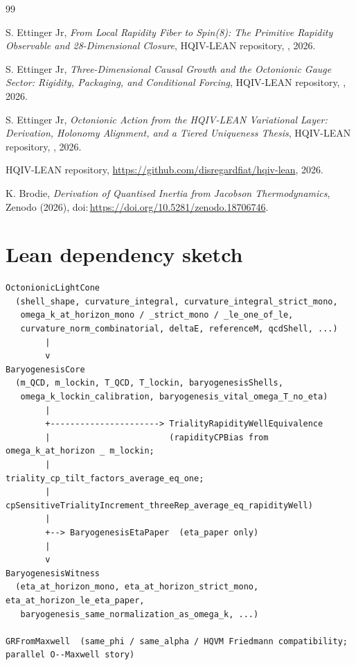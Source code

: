 \documentclass[11pt]{amsart}
\begin{document}
\begin{thebibliography}{99}

S. Ettinger Jr, \emph{From Local Rapidity Fiber to Spin(8): The Primitive Rapidity Observable and 28-Dimensional Closure}, HQIV-LEAN repository, , 2026.

S. Ettinger Jr, \emph{Three-Dimensional Causal Growth and the Octonionic Gauge Sector: Rigidity, Packaging, and Conditional Forcing}, HQIV-LEAN repository, , 2026.

S. Ettinger Jr, \emph{Octonionic Action from the HQIV-LEAN Variational Layer: Derivation, Holonomy Alignment, and a Tiered Uniqueness Thesis}, HQIV-LEAN repository, , 2026.

HQIV-LEAN repository, \url{https://github.com/disregardfiat/hqiv-lean}, 2026.

K. Brodie, \emph{Derivation of Quantised Inertia from Jacobson Thermodynamics}, Zenodo (2026), doi:\,\url{https://doi.org/10.5281/zenodo.18706746}.

\end{thebibliography}

\appendix
\section{Lean dependency sketch}

\begin{verbatim}
OctonionicLightCone
  (shell_shape, curvature_integral, curvature_integral_strict_mono,
   omega_k_at_horizon_mono / _strict_mono / _le_one_of_le,
   curvature_norm_combinatorial, deltaE, referenceM, qcdShell, ...)
        |
        v
BaryogenesisCore
  (m_QCD, m_lockin, T_QCD, T_lockin, baryogenesisShells,
   omega_k_lockin_calibration, baryogenesis_vital_omega_T_no_eta)
        |
        +----------------------> TrialityRapidityWellEquivalence
        |                        (rapidityCPBias from omega_k_at_horizon _ m_lockin;
        |                         triality_cp_tilt_factors_average_eq_one;
        |                         cpSensitiveTrialityIncrement_threeRep_average_eq_rapidityWell)
        |
        +--> BaryogenesisEtaPaper  (eta_paper only)
        |
        v
BaryogenesisWitness
  (eta_at_horizon_mono, eta_at_horizon_strict_mono, eta_at_horizon_le_eta_paper,
   baryogenesis_same_normalization_as_omega_k, ...)

GRFromMaxwell  (same_phi / same_alpha / HQVM Friedmann compatibility; parallel O--Maxwell story)
\end{verbatim}
\end{document}
